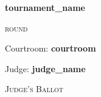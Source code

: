 \documentclass{article}
\begin{document}
\begin{center}
    \vspace{2em}
    {\LARGE\textbf{{{ tournament_name }}}}

    \vspace{1.2em}
    {\large\textsc{{{ round }}}}

    \vspace{0.8em}
    {\large Courtroom: \textbf{{{ courtroom }}}}

    \vspace{1em}
    {\large Judge: \textbf{{{ judge_name }}}}
    \vspace{1.5em}
\end{center}

\begin{center}
    \vspace{0.5em}
    {\large\textsc{Judge's Ballot}}
\end{center}
\end{document}
